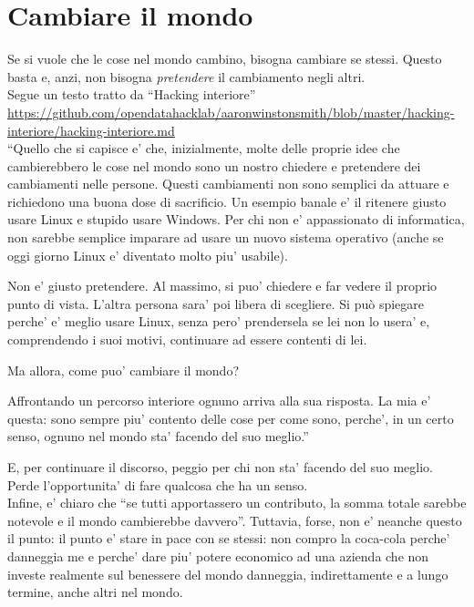 \chapter{Cambiare il mondo}

Se si vuole che le cose nel mondo cambino, bisogna cambiare se stessi. Questo basta e, anzi, non bisogna \emph{pretendere} il cambiamento negli altri.\\

Segue un testo tratto da ``Hacking interiore''\\
\url{https://github.com/opendatahacklab/aaronwinstonsmith/blob/master/hacking-interiore/hacking-interiore.md}\\

``Quello che si capisce e' che, inizialmente, molte delle proprie idee che cambierebbero le cose nel mondo sono un nostro chiedere e pretendere dei cambiamenti nelle persone. Questi cambiamenti non sono semplici da attuare e richiedono una buona dose di sacrificio. Un esempio banale e' il ritenere giusto usare Linux e stupido usare Windows. Per chi non e' appassionato di informatica, non sarebbe semplice imparare ad usare un nuovo sistema operativo (anche se oggi giorno Linux e' diventato molto piu' usabile).

Non e' giusto pretendere. Al massimo, si puo' chiedere e far vedere il proprio punto di vista. L'altra persona sara' poi libera di scegliere. Si può spiegare perche' e' meglio usare Linux, senza pero' prendersela se lei non lo usera' e, comprendendo i suoi motivi, continuare ad essere contenti di lei.

Ma allora, come puo' cambiare il mondo?

Affrontando un percorso interiore ognuno arriva alla sua risposta. La mia e' questa: sono sempre piu' contento delle cose per come sono, perche', in un certo senso, ognuno nel mondo sta' facendo del suo meglio.''

E, per continuare il discorso, peggio per chi non sta' facendo del suo meglio. Perde l'opportunita' di fare qualcosa che ha un senso.\\
Infine, e' chiaro che ``se tutti apportassero un contributo, la somma totale sarebbe notevole e il mondo cambierebbe davvero''. Tuttavia, forse, non e' neanche questo il punto: il punto e' stare in pace con se stessi: non compro la coca-cola perche' danneggia me e perche' dare piu' potere economico ad una azienda che non investe realmente sul benessere del mondo danneggia, indirettamente e a lungo termine, anche altri nel mondo.

